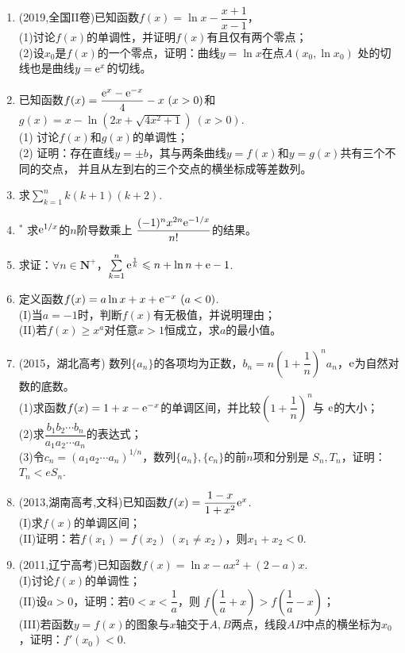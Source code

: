 \begin{enumerate}[label={\textbf{\thechapter.\arabic*}},leftmargin=
    \inteval{\myenumleftmargin}pt]
\item 
(2019,全国II卷)已知函数$ f(x)=\ln x-\dfrac{x+1}{x-1} $，\\
(1)讨论$ f(x) $的单调性，并证明$ f(x) $有且仅有两个零点；\\
(2)设$ x_0 $是$ f(x) $的一个零点，证明：曲线$ y=\ln x $在点$ A(x_0,\ln x_0) $
处的切线也是曲线$ y=\mathrm{e}^x $的切线。

\item 已知函数$f(x)=\dfrac{\mathrm{e}^x-\mathrm{e}^{-x}}{4}-x\ (x>0) $和
$ g(x)=x-\ln(2x+\sqrt{4x^2+1})\ (x>0) $. \\
(1) 讨论$ f(x) $和$ g(x) $的单调性；\\
(2) 证明：存在直线$y=\pm b$，其与两条曲线$y=f(x)$和$y=g(x)$共有三个不同的交点，
并且从左到右的三个交点的横坐标成等差数列。

\item 求$ \sum\limits_{k=1}^n k(k+1)(k+2) $.

\item $ ^* $ 求$ \mathrm{e}^{1/x} $的$ n $阶导数乘上
$ \dfrac{(-1)^nx^{2n}\mathrm{e}^{-1/x}}{n!} $的结果。

\item 求证：$ \forall n\in \textbf{N}^+ $，$ \sum\limits_{k=1}^{n} 
\mathrm{e}^{\frac{1}{k}}\leqslant n+\ln n+\mathrm{e} -1 $. 

\item 定义函数$ f(x)=a\ln x+x+\e^{-x} \ (a<0) $. \\
(I)当$ a=-1 $时，判断$ f(x) $有无极值，并说明理由；\\
(II)若$ f(x)\geq x^a $对任意$ x>1 $恒成立，求$ a $的最小值。

\item (2015，湖北高考) 数列$ \{a_n\} $的各项均为正数，$ b_n=n\left(1+\dfrac{1}{n}\right)^na_n $，$ \mathrm{e} $为自然对数的底数。\\
(1)求函数$ f(x)=1+x-\mathrm{e}^{-x} $的单调区间，并比较$ \left(1+\dfrac{1}{n}\right)^n $与
$ \mathrm{e} $的大小；\\
(2)求$ \dfrac{b_1b_2\cdots b_n}{a_1a_2\cdots a_n} $的表达式；\\
(3)令$ c_n=(a_1a_2\cdots a_n)^{1/n} $，数列$ \{a_n\},\{c_n\} $的前$ n $项和分别是
$ S_n,T_n $，证明：$ T_n<eS_n $.

\item (2013,湖南高考,文科)已知函数$ f(x)=\dfrac{1-x}{1+x^2}\mathrm{e}^x $.\\
(I)求$ f(x) $的单调区间；\\
(II)证明：若$ f(x_1)=f(x_2)\ (x_1\neq x_2) $，则$ x_1+x_2<0 $. 

\item (2011,辽宁高考)已知函数$ f(x)=\ln x-ax^2+(2-a)x $.\\
(I)讨论$ f(x) $的单调性；\\
(II)设$ a>0 $，证明：若$ 0<x<\dfrac{1}{a} $，则
$ f\left(\dfrac{1}{a}+x\right)>f\left(\dfrac{1}{a}-x\right) $；\\
(III)若函数$ y=f(x) $的图象与$ x $轴交于$ A,B $两点，线段$ AB $中点的横坐标为$ x_0 $，证明：$ f'(x_0)<0 $. 


\end{enumerate}
